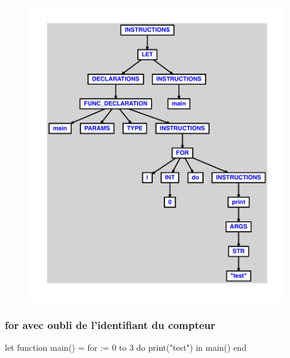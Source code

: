 \documentclass{article}
\begin{document}
\begin{figure}[H]\centering\includegraphics[max width=\textwidth]{ast/ast_184.pdf}\end{figure}\subsubsection{for avec oubli de l'identifiant du compteur}
\begin{verbatimtab}
let
	function main() =
		for := 0 to 3 do
			print("test")
in main() end
\end{verbatimtab}
\end{document}
